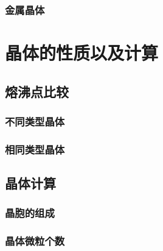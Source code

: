 \documentclass[a4paper]{article}
\begin{document}
	\subsubsection{金属晶体}
	
	
	\clearpage
	\section{晶体的性质以及计算}
	
	
	\subsection{熔沸点比较}
	
	\subsubsection{不同类型晶体}
	
	\subsubsection{相同类型晶体}
	
	
	\subsection{晶体计算}
	
	\subsubsection{晶胞的组成}
	
	\subsubsection{晶体微粒个数}
	
\end{document}
